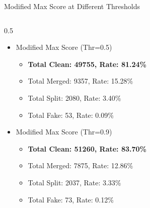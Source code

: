 \documentclass[xcolor=table,aspectratio=169]{beamer}
\begin{document}
\begin{frame}{Modified Max Score at Different Thresholds}
    \begin{columns}
        \begin{column}{0.5\linewidth}
            \begin{itemize}
                \item Modified Max Score (Thr=0.5)
                \begin{itemize}
                    \item \textbf{Total Clean: 49755, Rate: 81.24\%}
                    \item Total Merged: 9357, Rate: 15.28\%
                    \item Total Split: 2080, Rate: 3.40\%
                    \item Total Fake: 53, Rate: 0.09\%
                \end{itemize}
                \item Modified Max Score (Thr=0.9)
                \begin{itemize}
                    \item \textbf{Total Clean: 51260, Rate: 83.70\%}
                    \item Total Merged: 7875, Rate: 12.86\%
                    \item Total Split: 2037, Rate: 3.33\%
                    \item Total Fake: 73, Rate: 0.12\%
                \end{itemize}
            \end{itemize}
        \end{column}


\end{columns}
\end{frame}
\end{document}
